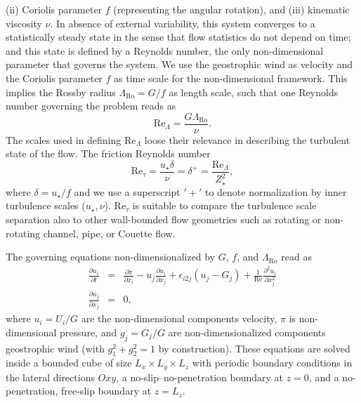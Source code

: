 \documentclass[a4paper,11pt]{amsart}
\newcommand{\p}{\partial}
\newcommand{\RO}{\mathrm{Ro}}
\newcommand{\RE}{\mathrm{Re}}
\newcommand{\LR}{\Lambda_\RO}
\begin{document}
(ii)  Coriolis parameter $f$ (representing the angular rotation), and
(iii) kinematic viscosity $\nu$.
%
In absence of external variability, this system converges to a statistically steady state in the sense that flow
statistics do not depend on time; and this state is defined by a Reynolds number,
the only non-dimensional parameter that governs the system.
%
We use the geostrophic wind as velocity and the Coriolis parameter $f$ as time scale for the non-dimensional
framework.
%
This implies the Rossby radius $\LR=G/f$ as length scale, such that one Reynolds number
governing the problem reads as
%
\begin{equation}
  \RE_\Lambda=\frac{G \LR }{\nu}. 
\end{equation}
%
The scales used in defining $\RE_\Lambda$ loose their relevance in describing the turbulent state of the flow.
%
The friction Reynolds number
\begin{equation}
  \RE_\tau = \frac{u_\star\delta}{\nu} = \delta^+ = \frac{\RE_\Lambda}{Z_\star^2}, 
\end{equation}
where $\delta=u_\star/f$ and we use a superscript $'+'$ to denote normalization by inner turbulence
scales ($u_\star, \nu$).
%
$\RE_\tau$ is suitable to compare the turbulence scale separation also to other wall-bounded flow geometries
such as rotating or non-rotating channel, pipe, or Couette flow.
%
\par
%
The governing equations  non-dimensionalized by $G$, $f$, and $\Lambda_\mathrm{\RO}$ read as 
\begin{subequations} 
\label{eqn:governing} 
\begin{eqnarray}
  \frac{\partial u_i}{\partial t} &=& \frac{\p \pi}{\p x_i} - u_j \frac{\p u_i}{\p x_j} + \epsilon_{i2j} (u_j -G_j)   + \frac{1}{\RE} \frac{\p^2 u_i}{\p x_{j}^2} \\ 
  \frac{\partial u_j}{\partial x_j} &=& 0,   
\end{eqnarray} 
\end{subequations}
where $u_i=U_i/G$ are the non-dimensional components velocity, $\pi$ is non-dimensional pressure, and $g_j=G_j/G$ are non-dimensionalized components
geostrophic wind (with $g_{1}^2+g_{2}^2=1$ by construction).
%
These equations are solved inside a bounded cube of size $L_x \times L_y \times L_z$ with periodic boundary conditions in the lateral directions $Oxy$, a no-slip--no-penetration boundary at $z=0$, and
a no-penetration, free-slip boundary at $z=L_z$.
%
\end{document}
